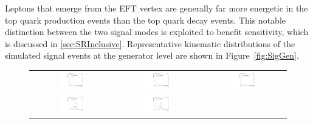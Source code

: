 Leptons that emerge from the \ac{EFT} vertex are generally far more energetic in the top quark production events than the top quark decay events. This notable distinction between the two signal modes is exploited to benefit sensitivity, which is discussed in \autoref{sec:SRInclusive}. Representative kinematic distributions of the simulated signal events at the generator level are shown in Figure~\ref{fig:SigGen}.

 \begin{figure}[tbh!]
 \begin{center}
 \begin{tabular}{ccc}
 \includegraphics[width=0.33\textwidth]{figures/Part4/Signal/llM_emu}&
 \includegraphics[width=0.33\textwidth]{figures/Part4/Signal/llM_etau}&
 \includegraphics[width=0.33\textwidth]{figures/Part4/Signal/llM_mutau}\\
 \includegraphics[width=0.33\textwidth]{figures/Part4/Signal/llDr_emu}&
 \includegraphics[width=0.33\textwidth]{figures/Part4/Signal/llDr_etau}&

\end{tabular}
\end{center}
\end{figure}
